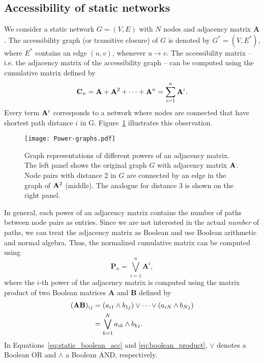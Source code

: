 \subsection{Accessibility of static networks}\label{sec:unfolding_static}
We consider a static network $G=(V,E)$ with $N$ nodes and adjacency matrix $\mathbf{A}$.
The accessibility graph (or transitive closure) of $G$ is denoted by $G^*=(V,E^*)$, where $E^*$ contains an edge $(u,v)$, whenever $u\rightarrow v$.
The accessibility matrix -- i.e. the adjacency matrix of the accessibility graph -- can be computed using the cumulative matrix defined by
\begin{equation}\label{eq:cumulative_matrix2}
\mathbf{C}_n=\mathbf{A}+\mathbf{A}^2+\cdots + \mathbf{A}^n = \sum _{i=1} ^n \mathbf{A}^i .
\end{equation}
Every term $\mathbf{A}^i$ corresponds to a network where nodes are connected that have shortest path distance $i$ in G.
Figure~\ref{fig:power_graphs} illustrates this observation.
%
\begin{SCfigure}
\texttt{[image: Power-graphs.pdf]}
\caption{Graph representations of different powers of an adjacency matrix.
The left panel shows the original graph $G$ with adjacency matrix $\mathbf{A}$.
Node pairs with distance 2 in $G$ are connected by an edge in the graph of $\mathbf{A}^2$ (middle).
The analogue for distance 3 is shown on the right panel.}
\label{fig:power_graphs}
\end{SCfigure}

In general, each power of an adjacency matrix contains the number of paths between node pairs as entries.
Since we are not interested in the actual \emph{number} of paths, we can treat the adjacency matrix as Boolean and use Boolean arithmetic and normal algebra.
Thus, the normalized cumulative matrix can be computed using
\begin{equation}\label{eq:static_boolean_acc}
\mathbf{P}_{n}=\bigvee _{i=1} ^{n} \mathbf{A}^i ,
\end{equation}
where the $i$-th power of the adjacency matrix is computed using the matrix product of two Boolean matrices $\mathbf{A}$ and $\mathbf{B}$ defined by 
\begin{align}\label{eq:boolean_product}
(\mathbf{A}\mathbf{B})_{ij}&=(a_{i1}\wedge b_{1j})\vee \dots \vee(a_{iN}\wedge b_{Nj}) \nonumber \\
&= \bigvee _{k=1}^N a_{ik} \wedge b_{kj} .
\end{align}
In Equations~\eqref{eq:static_boolean_acc} and \eqref{eq:boolean_product}, $\vee $ denotes a Boolean OR and $\wedge $ a Boolean AND, respectively.

